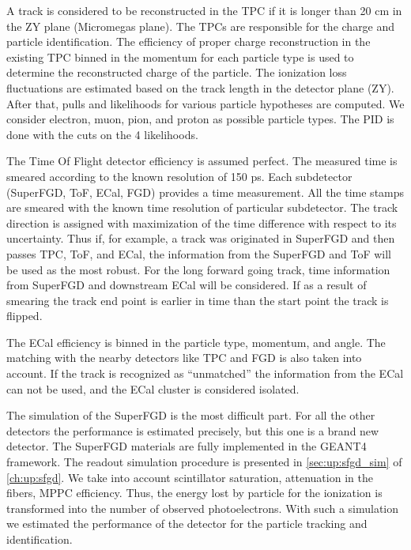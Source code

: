 \documentclass[main.tex]{subfiles}
\begin{document}
A track is considered to be reconstructed in the TPC if it is longer than 20 cm in the ZY plane (Micromegas plane). The TPCs are responsible for the charge and particle identification. The efficiency of proper charge reconstruction in the existing TPC binned in the momentum for each particle type is used to determine the reconstructed charge of the particle. The ionization loss fluctuations are estimated based on the track length in the detector plane (ZY). After that, pulls and likelihoods for various particle hypotheses are computed. We consider electron, muon, pion, and proton as possible particle types. The PID is done with the cuts on the 4 likelihoods.

The Time Of Flight detector efficiency is assumed perfect. The measured time is smeared according to the known resolution of 150 ps. Each subdetector (SuperFGD, ToF, ECal, FGD) provides a time measurement. All the time stamps are smeared with the known time resolution of particular subdetector. The track direction is assigned with maximization of the time difference with respect to its uncertainty. Thus if, for example, a track was originated in SuperFGD and then passes TPC, ToF, and ECal, the information from the SuperFGD and ToF will be used as the most robust. For the long forward going track, time information from SuperFGD and downstream ECal will be considered. If as a result of smearing the track end point is earlier in time than the start point the track is flipped.

The ECal efficiency is binned in the particle type, momentum, and angle. The matching with the nearby detectors like TPC and FGD is also taken into account. If the track is recognized as ``unmatched'' the information from the ECal can not be used, and the ECal cluster is considered isolated.

The simulation of the SuperFGD is the most difficult part. For all the other detectors the performance is estimated precisely, but this one is a brand new detector. The SuperFGD materials are fully implemented in the GEANT4 framework. The readout simulation procedure is presented in \autoref{sec:up:sfgd_sim} of \autoref{ch:up:sfgd}. We take into account scintillator saturation, attenuation in the fibers, MPPC efficiency. Thus, the energy lost by particle for the ionization is transformed into the number of observed photoelectrons. With such a simulation we estimated the performance of the detector for the particle tracking and identification.
\end{document}
